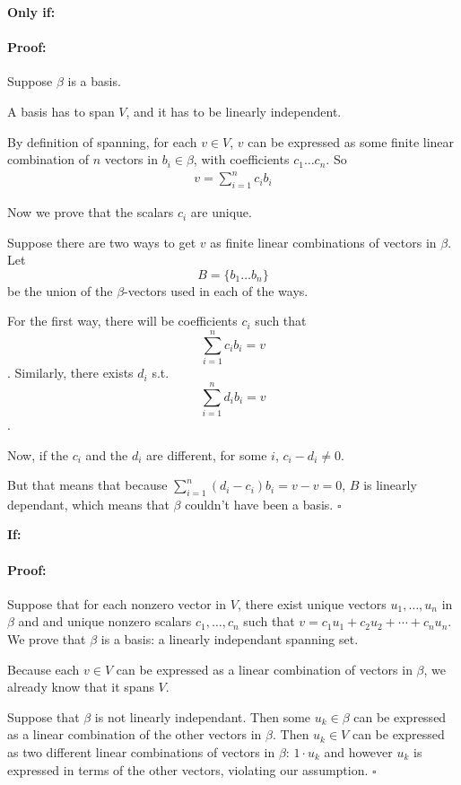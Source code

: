 \documentclass[12pt]{article}
\newenvironment{proof}{\paragraph{Proof:}}{\hfill$\square$}
\begin{document}
    
    \noindent\textbf{Only if:}
    \begin{proof}
        Suppose $\beta$ is a basis.
    
        A basis has to span $V$, and it has to be linearly independent.
    
        By definition of spanning, for each $v\in V$, $v$ can be expressed as some finite linear combination of $n$ vectors in $b_i\in \beta$, with coefficients $c_1\ldots c_n$. So
        \begin{align*}
            v = \sum_{i=1}^n c_i b_i
        \end{align*}
        
        Now we prove that the scalars $c_i$ are unique.
        
        Suppose there are two ways to get $v$ as finite linear combinations of vectors in $\beta$. Let $$B=\{b_1\ldots b_n\}$$ be the union of the $\beta$-vectors used in each of the ways.
        
        For the first way, there will be coefficients $c_i$ such that $$\sum_{i=1}^n c_i b_i = v$$. Similarly, there exists $d_i$ s.t. $$\sum_{i=1}^n d_ib_i = v$$. 
        
        Now, if the $c_i$ and the $d_i$ are different, for some $i$, $c_i-d_i\neq 0$.
        
        But that means that because $\sum_{i=1}^n (d_i-c_i)b_i = v-v= 0$, $B$ is linearly dependant, which means that $\beta$ couldn't have been a basis.
    \end{proof}
    
    \noindent\textbf{If:}
    
    \begin{proof}
        Suppose that for each nonzero vector in $V$, there exist unique vectors $u_1, \dots, u_n$ in $\beta$ and and unique nonzero scalars $c_1, \dots, c_n$ such that $v = c_1u_1 + c_2u_2 + \cdots + c_nu_n.$ We prove that $\beta$ is a basis: a linearly independant spanning set.
        
        Because each $v\in V$ can be expressed as a linear combination of vectors in $\beta$, we already know that it spans $V$.
        
        Suppose that $\beta$ is not linearly independant. Then some $u_k\in \beta$ can be expressed as a linear combination of the other vectors in $\beta$. Then $u_k\in V$ can be expressed as two different linear combinations of vectors in $\beta$: $1\cdot u_k$ and however $u_k$ is expressed in terms of the other vectors, violating our assumption.
    \end{proof}
    
    \newpage
    
    
    
\end{document}
